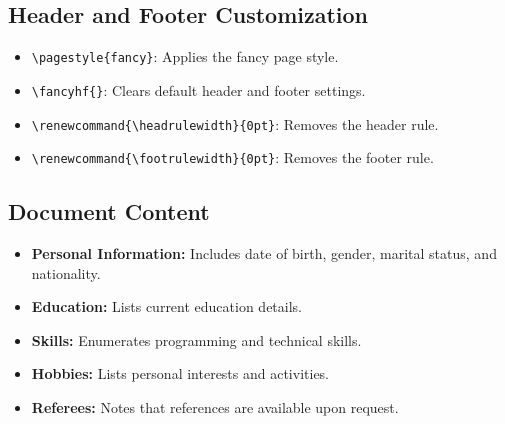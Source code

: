 \documentclass[a4paper,12pt]{article}
\begin{document}
\subsection{Header and Footer Customization}
\begin{itemize}
    \item \texttt{\textbackslash pagestyle\{fancy\}}: Applies the fancy page style.
    \item \texttt{\textbackslash fancyhf\{\}}: Clears default header and footer settings.
    \item \texttt{\textbackslash renewcommand\{\textbackslash headrulewidth\}\{0pt\}}: Removes the header rule.
    \item \texttt{\textbackslash renewcommand\{\textbackslash footrulewidth\}\{0pt\}}: Removes the footer rule.
\end{itemize}

\subsection{Document Content}
\begin{itemize}
    \item \textbf{Personal Information:} Includes date of birth, gender, marital status, and nationality.
    \item \textbf{Education:} Lists current education details.
    \item \textbf{Skills:} Enumerates programming and technical skills.
    \item \textbf{Hobbies:} Lists personal interests and activities.
    \item \textbf{Referees:} Notes that references are available upon request.
\end{itemize}
    
\end{document}
